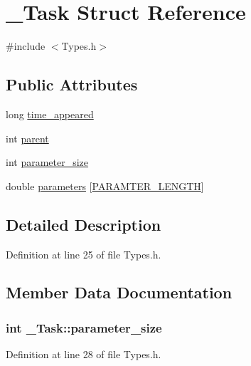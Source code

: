 \hypertarget{struct___task}{}\section{\+\_\+\+Task Struct Reference}
\label{struct___task}


{\ttfamily \#include $<$Types.\+h$>$}

\subsection*{Public Attributes}
\begin{DoxyCompactItemize}
\item 
long \hyperlink{struct___task_af6627e17a6012b29392f3decfcc52c99}{time\+\_\+appeared}
\item 
int \hyperlink{struct___task_abeed33dfd888cd92c22842de87158721}{parent}
\item 
int \hyperlink{struct___task_ac0f438d616d66857ac9a10d58e7a2c3e}{parameter\+\_\+size}
\item 
double \hyperlink{struct___task_ab8513f93ddd80bfbc5f9e30d931d0650}{parameters} \mbox{[}\hyperlink{_types_extern_8h_a5fd5639a688c3c7ecd8243b9509be62d}{P\+A\+R\+A\+M\+T\+E\+R\+\_\+\+L\+E\+N\+G\+T\+H}\mbox{]}
\end{DoxyCompactItemize}


\subsection{Detailed Description}


Definition at line 25 of file Types.\+h.



\subsection{Member Data Documentation}
\hypertarget{struct___task_ac0f438d616d66857ac9a10d58e7a2c3e}{}
\subsubsection[{parameter\+\_\+size}]{\setlength{\rightskip}{0pt plus 5cm}int \+\_\+\+Task\+::parameter\+\_\+size}\label{struct___task_ac0f438d616d66857ac9a10d58e7a2c3e}


Definition at line 28 of file Types.\+h.

